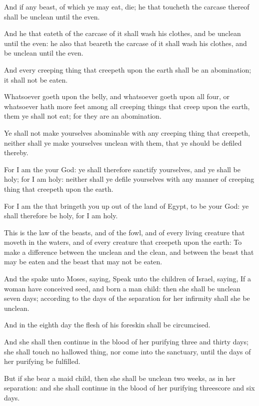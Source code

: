 \Verse And if any beast, of which ye may eat, die; he that toucheth the carcase thereof shall be unclean until the even.

\Verse And he that eateth of the carcase of it shall wash his clothes, and be unclean until the even: he also that beareth the carcase of it shall wash his clothes, and be unclean until the even.

\Verse And every creeping thing that creepeth upon the earth shall be an abomination; it shall not be eaten.

\Verse Whatsoever goeth upon the belly, and whatsoever goeth upon all four, or whatsoever hath more feet among all creeping things that creep upon the earth, them ye shall not eat; for they are an abomination.

\Verse Ye shall not make yourselves abominable with any creeping thing that creepeth, neither shall ye make yourselves unclean with them, that ye should be defiled thereby.

\Verse For I am the \LORD your God: ye shall therefore sanctify yourselves, and ye shall be holy; for I am holy: neither shall ye defile yourselves with any manner of creeping thing that creepeth upon the earth.

\Verse For I am the \LORD that bringeth you up out of the land of Egypt, to be your God: ye shall therefore be holy, for I am holy.

\Verse This is the law of the beasts, and of the fowl, and of every living creature that moveth in the waters, and of every creature that creepeth upon the earth: \Verse To make a difference between the unclean and the clean, and between the beast that may be eaten and the beast that may not be eaten.

\Chapter
\Verse And the \LORD spake unto Moses, saying, \Verse Speak unto the children of Israel, saying, If a woman have conceived seed, and born a man child: then she shall be unclean seven days; according to the days of the separation for her infirmity shall she be unclean.

\Verse And in the eighth day the flesh of his foreskin shall be circumcised.

\Verse And she shall then continue in the blood of her purifying three and thirty days; she shall touch no hallowed thing, nor come into the sanctuary, until the days of her purifying be fulfilled.

\Verse But if she bear a maid child, then she shall be unclean two weeks, as in her separation: and she shall continue in the blood of her purifying threescore and six days.

